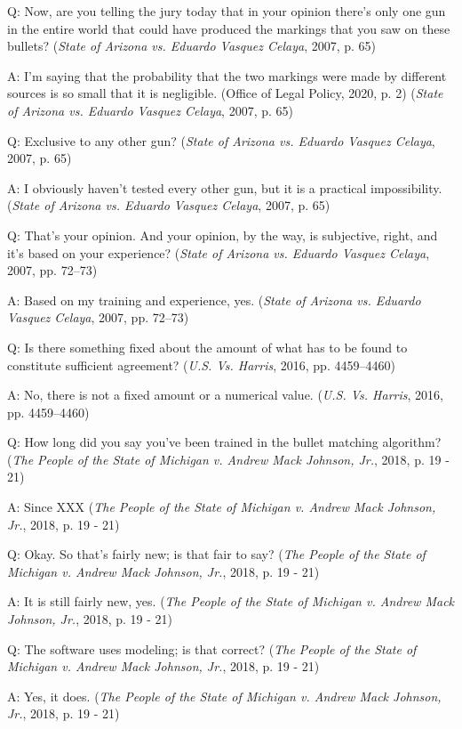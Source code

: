 \documentclass[print]{nuthesis}
\begin{document}
Q: Now, are you telling the jury today that in your opinion there's only one gun in the entire world that could have produced the markings that you saw on these bullets? (\emph{State of {Arizona} vs. Eduardo {Vasquez} {Celaya}}, 2007, p. 65)

A: I'm saying that the probability that the two markings were made by different sources is so small that it is negligible. (Office of Legal Policy, 2020, p. 2) (\emph{State of {Arizona} vs. Eduardo {Vasquez} {Celaya}}, 2007, p. 65)

Q: Exclusive to any other gun? (\emph{State of {Arizona} vs. Eduardo {Vasquez} {Celaya}}, 2007, p. 65)

A: I obviously haven't tested every other gun, but it is a practical impossibility. (\emph{State of {Arizona} vs. Eduardo {Vasquez} {Celaya}}, 2007, p. 65)

Q: That's your opinion. And your opinion, by the way, is subjective, right, and it's based on your experience? (\emph{State of {Arizona} vs. Eduardo {Vasquez} {Celaya}}, 2007, pp. 72--73)

A: Based on my training and experience, yes. (\emph{State of {Arizona} vs. Eduardo {Vasquez} {Celaya}}, 2007, pp. 72--73)

Q: Is there something fixed about the amount of what has to be found to constitute sufficient agreement? (\emph{{U.S.} Vs. {Harris}}, 2016, pp. 4459--4460)

A: No, there is not a fixed amount or a numerical value. (\emph{{U.S.} Vs. {Harris}}, 2016, pp. 4459--4460)

Q: How long did you say you've been trained in the bullet matching algorithm? (\emph{The {People} of the {State} of {Michigan} v. Andrew {Mack} {Johnson}, {Jr.}}, 2018, p. 19 - 21)

A: Since XXX (\emph{The {People} of the {State} of {Michigan} v. Andrew {Mack} {Johnson}, {Jr.}}, 2018, p. 19 - 21)

Q: Okay. So that's fairly new; is that fair to say? (\emph{The {People} of the {State} of {Michigan} v. Andrew {Mack} {Johnson}, {Jr.}}, 2018, p. 19 - 21)

A: It is still fairly new, yes. (\emph{The {People} of the {State} of {Michigan} v. Andrew {Mack} {Johnson}, {Jr.}}, 2018, p. 19 - 21)

Q: The software uses modeling; is that correct? (\emph{The {People} of the {State} of {Michigan} v. Andrew {Mack} {Johnson}, {Jr.}}, 2018, p. 19 - 21)

A: Yes, it does. (\emph{The {People} of the {State} of {Michigan} v. Andrew {Mack} {Johnson}, {Jr.}}, 2018, p. 19 - 21)
\end{document}

